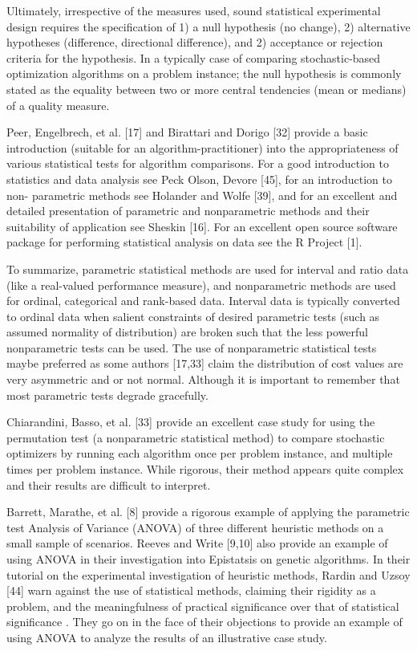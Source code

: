 \documentclass[a4paper, 11pt]{article}
\begin{document}
Ultimately, irrespective of the measures used, sound statistical experimental design requires the specification of 1) a null hypothesis (no change), 2) alternative hypotheses (difference, directional difference), and 2) acceptance or rejection criteria for the hypothesis. In a typically	case	of	comparing	stochastic-based optimization algorithms on a problem instance; the null hypothesis is commonly stated as the equality between two or more central tendencies (mean or medians) of a quality measure.

Peer, Engelbrech, et al. [17] and Birattari and Dorigo [32] provide a basic introduction (suitable for an algorithm-practitioner) into the appropriateness of various statistical tests for algorithm comparisons. For a good introduction to statistics and data analysis see Peck Olson, Devore [45], for an introduction to non- parametric methods see Holander and Wolfe [39], and for an excellent and detailed presentation of parametric and nonparametric methods and their suitability of application see Sheskin [16]. For an excellent open source software package for performing statistical analysis on data see the R Project [1].

To summarize, parametric statistical methods are used for interval and ratio data (like a real-valued performance measure), and nonparametric methods are used for ordinal, categorical and rank-based data. Interval data is typically converted to ordinal data when salient constraints of desired parametric tests (such as assumed normality of distribution) are broken such that the less powerful nonparametric tests can be used. The use of nonparametric statistical tests maybe preferred as some authors [17,33] claim the distribution of cost values are very asymmetric and or not normal. Although it is important to remember that most parametric tests degrade gracefully.

Chiarandini, Basso, et al. [33] provide an excellent case study for using the permutation test (a nonparametric statistical method) to compare stochastic optimizers by running each algorithm once per problem instance, and multiple times per problem instance. While rigorous, their method appears quite complex and their results are difficult to interpret.

Barrett, Marathe, et al. [8] provide a rigorous example of applying the parametric test Analysis of Variance (ANOVA) of three different heuristic methods on a small sample of scenarios. Reeves and Write [9,10] also provide an example of using ANOVA in their investigation into Epistatsis on genetic algorithms. In their tutorial on the experimental investigation of heuristic methods, Rardin and Uzsoy [44] warn against the use of statistical methods, claiming their rigidity as a problem, and the meaningfulness of practical significance over that of statistical significance . They go on in the face of their objections to provide an example of using ANOVA to analyze the results of an illustrative case study.
\end{document}
